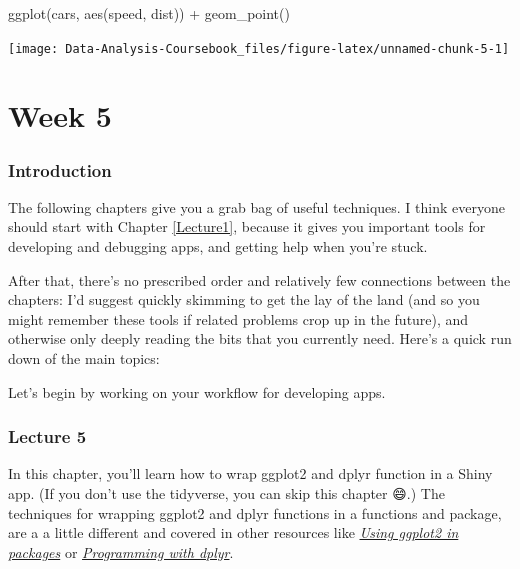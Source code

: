 \documentclass[
]{article}
\newenvironment{Shaded}{\begin{snugshade}}{\end{snugshade}}
\newcommand{\FunctionTok}[1]{\textcolor[rgb]{0.00,0.00,0.00}{#1}}
\newcommand{\NormalTok}[1]{#1}
\newcommand{\SpecialCharTok}[1]{\textcolor[rgb]{0.00,0.00,0.00}{#1}}
\begin{document}
\begin{Shaded}
\begin{Highlighting}[]
\FunctionTok{ggplot}\NormalTok{(cars, }\FunctionTok{aes}\NormalTok{(speed, dist)) }\SpecialCharTok{+} 
  \FunctionTok{geom\_point}\NormalTok{()}
\end{Highlighting}
\end{Shaded}

\begin{center}\texttt{[image: Data-Analysis-Coursebook\_files/figure-latex/unnamed-chunk-5-1]} \end{center}

\hypertarget{part-week-5}{%
\part*{Week 5}\label{part-week-5}}

\hypertarget{week5-intro}{%
\section*{Introduction}\label{week5-intro}}

The following chapters give you a grab bag of useful techniques.
I think everyone should start with Chapter \ref{Lecture1}, because it gives you important tools for developing and debugging apps, and getting help when you're stuck.

After that, there's no prescribed order and relatively few connections between the chapters: I'd suggest quickly skimming to get the lay of the land (and so you might remember these tools if related problems crop up in the future), and otherwise only deeply reading the bits that you currently need.
Here's a quick run down of the main topics:

Let's begin by working on your workflow for developing apps.

\hypertarget{lecture5}{%
\section{Lecture 5}\label{lecture5}}

In this chapter, you'll learn how to wrap ggplot2 and dplyr function in a Shiny app.
(If you don't use the tidyverse, you can skip this chapter 😄.) The techniques for wrapping ggplot2 and dplyr functions in a functions and package, are a a little different and covered in other resources like \href{http://ggplot2.tidyverse.org/dev/articles/ggplot2-in-packages.html}{\emph{Using ggplot2 in packages}} or \href{http://dplyr.tidyverse.org/articles/programming.html}{\emph{Programming with dplyr}}.
\end{document}
